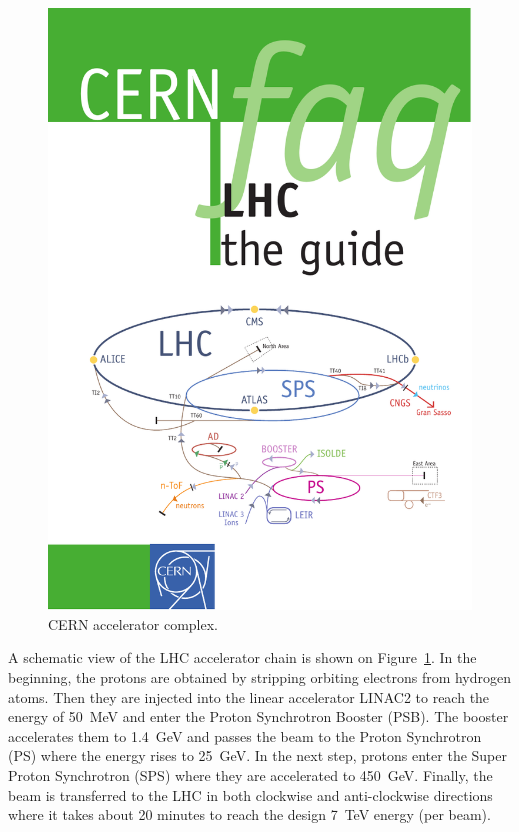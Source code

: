 \begin{figure}[!htbp]
  \begin{center}
    \leavevmode
    \includegraphics[width=\columnwidth]{LHC}
    \caption{CERN accelerator complex.}
    \label{LHC}
  \end{center}
\end{figure}

A schematic view of the LHC accelerator chain is shown on Figure~\ref{LHC}. In the beginning, the protons are obtained
by stripping orbiting electrons from hydrogen atoms. Then they are injected into the linear accelerator LINAC2 to reach
the energy of \SI{50}{\MeV} and enter the Proton Synchrotron Booster (PSB). The booster accelerates them to
\SI{1.4}{\GeV} and passes the beam to the Proton Synchrotron (PS) where the energy rises to \SI{25}{\GeV}. In the next
step, protons enter the Super Proton Synchrotron (SPS) where they are accelerated to \SI{450}{\GeV}. Finally, the beam
is transferred to the LHC in both clockwise and anti-clockwise directions where it takes about 20 minutes to reach the
design \SI{7}{\TeV} energy (per beam).

